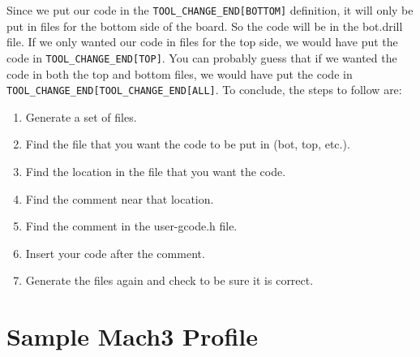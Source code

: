 \documentclass[11pt]{book}
\begin{document}
Since we put our code in the \lstinline!TOOL_CHANGE_END[BOTTOM]! definition, it will only be put in files for the bottom side of the board. So the code will be in the bot.drill file. If we only wanted our code in files for the top side, we would have put the code in \lstinline!TOOL_CHANGE_END[TOP]!. You can probably guess that if we wanted the code in both the top and bottom files, we would have put the code in \lstinline!TOOL_CHANGE_END[TOOL_CHANGE_END[ALL]!.
To conclude, the steps to follow are:
\begin{enumerate}

\item Generate a set of files.
\item Find the file that you want the code to be put in (bot, top, etc.).
\item Find the location in the file that you want the code.
\item Find the comment near that location.
\item Find the comment in the user-gcode.h file.
\item Insert your code after the comment.
\item Generate the files again and check to be sure it is correct.
\end{enumerate}

%
%
%

\appendix
\chapter{Sample Mach3 Profile}\label{chp:SampleProfile}
\end{document}
